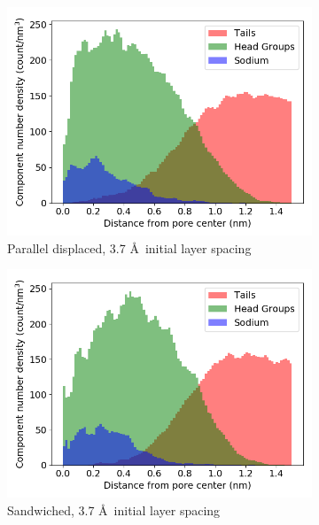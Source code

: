 \documentclass{article}
\begin{document}
  \begin{figure}
  \centering
  \begin{subfigure}{0.45\textwidth}
        \includegraphics[width=1\linewidth]{offset_density.png}
        \caption{Parallel displaced, 3.7 \AA~initial layer spacing}
        \label{fig:offset_density}
  \end{subfigure}
  \begin{subfigure}{0.45\textwidth}
        \includegraphics[width=1\linewidth]{layered_density.png}
        \caption{Sandwiched, 3.7 \AA~initial layer spacing}
        \label{fig:layered_density}
  \end{subfigure}
  \begin{subfigure}{0.45\textwidth}

\end{subfigure}
\end{figure}
\end{document}

